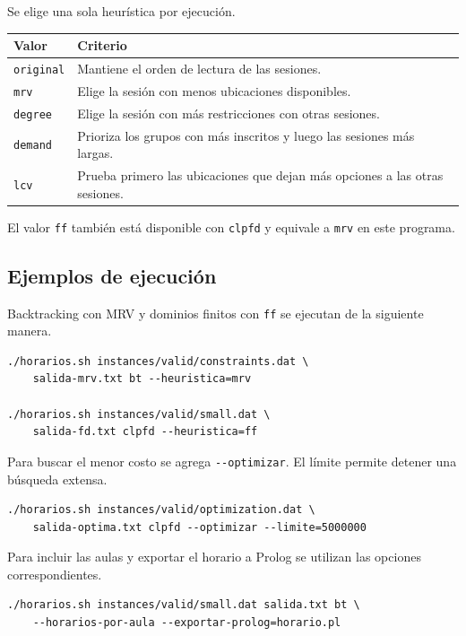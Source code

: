\documentclass[11pt,a4paper]{article}
\newcommand{\clioption}[1]{\texttt{-{}-#1}}
\begin{document}
Se elige una sola heurística por ejecución.

\begin{center}
\begin{tabularx}{\linewidth}{@{}lX@{}}
\toprule
\textbf{Valor} & \textbf{Criterio} \\
\midrule
\texttt{original} & Mantiene el orden de lectura de las sesiones. \\
\texttt{mrv} & Elige la sesión con menos ubicaciones disponibles. \\
\texttt{degree} & Elige la sesión con más restricciones con otras sesiones. \\
\texttt{demand} & Prioriza los grupos con más inscritos y luego las sesiones más largas. \\
\texttt{lcv} & Prueba primero las ubicaciones que dejan más opciones a las otras sesiones. \\
\bottomrule
\end{tabularx}
\end{center}

El valor \texttt{ff} también está disponible con \texttt{clpfd} y equivale a \texttt{mrv} en este programa.

\subsection{Ejemplos de ejecución}

Backtracking con MRV y dominios finitos con \texttt{ff} se ejecutan de la siguiente manera.

\begin{lstlisting}
./horarios.sh instances/valid/constraints.dat \
    salida-mrv.txt bt --heuristica=mrv

./horarios.sh instances/valid/small.dat \
    salida-fd.txt clpfd --heuristica=ff
\end{lstlisting}

Para buscar el menor costo se agrega \clioption{optimizar}. El límite permite detener una búsqueda extensa.

\begin{lstlisting}
./horarios.sh instances/valid/optimization.dat \
    salida-optima.txt clpfd --optimizar --limite=5000000
\end{lstlisting}

Para incluir las aulas y exportar el horario a Prolog se utilizan las opciones correspondientes.

\begin{lstlisting}
./horarios.sh instances/valid/small.dat salida.txt bt \
    --horarios-por-aula --exportar-prolog=horario.pl
\end{lstlisting}
\end{document}
